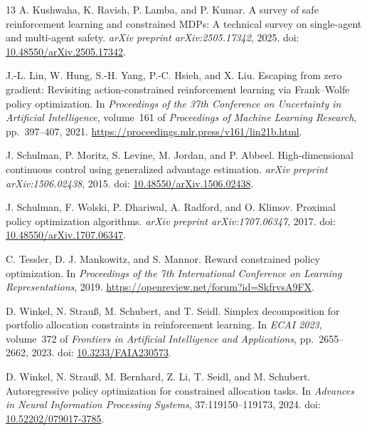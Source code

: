 \documentclass[10pt]{article}
\begin{document}
\begin{thebibliography}{13}
A. Kushwaha, K. Ravish, P. Lamba, and P. Kumar.
A survey of safe reinforcement learning and constrained MDPs:
A technical survey on single-agent and multi-agent safety.
\emph{arXiv preprint arXiv:2505.17342}, 2025.
doi: \href{https://doi.org/10.48550/arXiv.2505.17342}{10.48550/arXiv.2505.17342}.

J.-L. Lin, W. Hung, S.-H. Yang, P.-C. Hsieh, and X. Liu.
Escaping from zero gradient: Revisiting action-constrained reinforcement learning
via Frank--Wolfe policy optimization.
In \emph{Proceedings of the 37th Conference on Uncertainty in Artificial Intelligence},
volume~161 of \emph{Proceedings of Machine Learning Research}, pp.~397--407, 2021.
\url{https://proceedings.mlr.press/v161/lin21b.html}.

J. Schulman, P. Moritz, S. Levine, M. Jordan, and P. Abbeel.
High-dimensional continuous control using generalized advantage estimation.
\emph{arXiv preprint arXiv:1506.02438}, 2015.
doi: \href{https://doi.org/10.48550/arXiv.1506.02438}{10.48550/arXiv.1506.02438}.

J. Schulman, F. Wolski, P. Dhariwal, A. Radford, and O. Klimov.
Proximal policy optimization algorithms.
\emph{arXiv preprint arXiv:1707.06347}, 2017.
doi: \href{https://doi.org/10.48550/arXiv.1707.06347}{10.48550/arXiv.1707.06347}.

C. Tessler, D. J. Mankowitz, and S. Mannor.
Reward constrained policy optimization.
In \emph{Proceedings of the 7th International Conference on Learning Representations},
2019.
\url{https://openreview.net/forum?id=SkfrvsA9FX}.

D. Winkel, N. Strau{\ss}, M. Schubert, and T. Seidl.
Simplex decomposition for portfolio allocation constraints in reinforcement learning.
In \emph{ECAI 2023}, volume~372 of \emph{Frontiers in Artificial Intelligence
and Applications}, pp.~2655--2662, 2023.
doi: \href{https://doi.org/10.3233/FAIA230573}{10.3233/FAIA230573}.

D. Winkel, N. Strau{\ss}, M. Bernhard, Z. Li, T. Seidl, and M. Schubert.
Autoregressive policy optimization for constrained allocation tasks.
In \emph{Advances in Neural Information Processing Systems}, 37:119150--119173, 2024.
doi: \href{https://doi.org/10.52202/079017-3785}{10.52202/079017-3785}.

\end{thebibliography}
\end{document}
